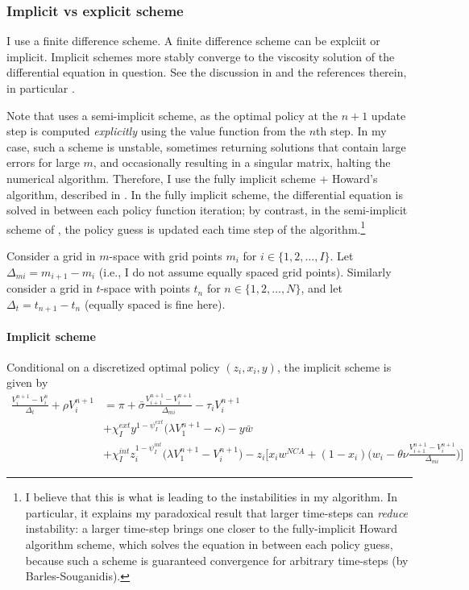 \documentclass[12pt,english]{article}
\theoremstyle{remark}
\begin{document}
\subsubsection{Implicit vs explicit scheme}
I use a finite difference scheme. A finite difference scheme can be explciit or implicit. Implicit schemes more stably converge to the viscosity solution of the differential equation in question. See the discussion in \cite{achdou_income_2017} and the references therein, in particular \cite{tourin_introduction_2013}. 

Note that \cite{achdou_income_2017} uses a semi-implicit scheme, as the optimal policy at the $n+1$ update step is computed \textit{explicitly} using the value function from the $n$th step. In my case, such a scheme is unstable, sometimes returning solutions that contain large errors for large $m$, and occasionally resulting in a singular matrix, halting the numerical algorithm. Therefore, I use the fully implicit scheme + Howard's algorithm, described in \cite{tourin_introduction_2013}. In the fully implicit scheme, the differential equation is solved in between each policy function iteration; by contrast, in the semi-implicit scheme of \cite{achdou_income_2017}, the policy guess is updated each time step of the algorithm.\footnote{I believe that this is what is leading to the instabilities in my algorithm. In particular, it explains my paradoxical result that larger time-steps can \textit{reduce} instability: a larger time-step brings one closer to the fully-implicit Howard algorithm scheme, which solves the equation in between each policy guess, because such a scheme is guaranteed convergence for arbitrary time-steps (by Barles-Souganidis).}

Consider a grid in $m$-space with grid points $m_i$ for $i \in \{ 1, 2, \ldots, I\}$. Let $\Delta_{mi} = m_{i+1} - m_i$ (i.e., I do not assume equally spaced grid points). Similarly consider a grid in $t$-space with points $t_n$ for $n \in \{1, 2, \ldots, N\}$, and let $\Delta_t = t_{n+1} - t_n$ (equally spaced is fine here). 

\paragraph{Implicit scheme}

Conditional on a discretized optimal policy $(z_i,x_i,y)$, the implicit scheme is given by  
\begin{align}
	\frac{V_i^{n+1} - V_i^{n}}{\Delta_t} + \rho V_i^{n+1} &= \pi + \bar{\sigma} \frac{V_{i+1}^{n+1} - V_i^{n+1}}{\Delta_{mi}} - \tau_i V_i^{n+1}  \nonumber \\
	&+ \chi_I^{ext} y^{1-\psi_I^{ext}} \Big( \lambda V_1^{n+1} - \kappa \Big) - y \bar{w} \nonumber \\
	&+ \chi_I^{int} z_i^{1-\psi_I^{int}} \Big( \lambda V_1^{n+1} - V_i^{n+1} \Big) - z_i \Big[ x_i w^{NCA} + (1-x_i) \Big( w_i - \theta \nu \frac{V_{i+1}^{n+1} - V_i^{n+1}}{\Delta_{mi}} \Big) \Big]
\end{align}
\end{document}
